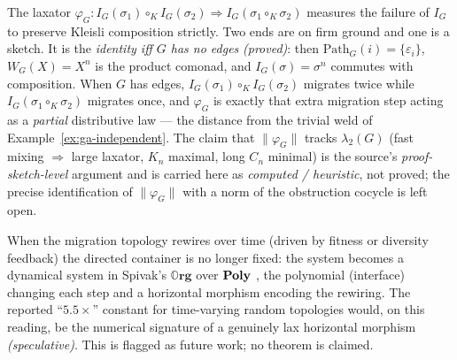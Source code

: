 \begin{remark}
\label{rem:ga-laxator}
The laxator $\varphi_G:I_G(\sigma_1)\circ_K I_G(\sigma_2)\Rightarrow
I_G(\sigma_1\circ_K\sigma_2)$ measures the failure of $I_G$ to preserve Kleisli
composition strictly. Two ends are on firm ground and one is a sketch. It is the
\emph{identity iff $G$ has no edges} \emph{(proved)}: then
$\mathrm{Path}_G(i)=\{\varepsilon_i\}$, $W_G(X)=X^n$ is the product comonad, and
$I_G(\sigma)=\sigma^n$ commutes with composition. When $G$ has edges,
$I_G(\sigma_1)\circ_K I_G(\sigma_2)$ migrates twice while
$I_G(\sigma_1\circ_K\sigma_2)$ migrates once, and $\varphi_G$ is exactly that
extra migration step acting as a \emph{partial} distributive law --- the
distance from the trivial weld of Example~\ref{ex:ga-independent}. The
claim that $\|\varphi_G\|$ tracks $\lambda_2(G)$ (fast mixing $\Rightarrow$ large
laxator, $K_n$ maximal, long $C_n$ minimal) is the source's
\emph{proof-sketch-level} argument and is carried here as \emph{computed /
heuristic}, not proved; the precise identification of $\|\varphi_G\|$ with a
norm of the obstruction cocycle is left open. %
\end{remark}

\begin{remark}
\label{rem:ga-level3}
When the migration topology rewires over time (driven by fitness or diversity
feedback) the directed container is no longer fixed: the system becomes a
dynamical system in Spivak's $\mathbb{O}\mathbf{rg}$ over $\mathbf{Poly}$
\cite{NiuSpivak,Spi21}, the polynomial (interface) changing each step and a
horizontal morphism encoding the rewiring. The reported ``$5.5\times$'' constant
for time-varying random topologies would, on this reading, be the numerical
signature of a genuinely lax horizontal morphism \emph{(speculative)}. This is
flagged as future work; no theorem is claimed. %
\end{remark}

